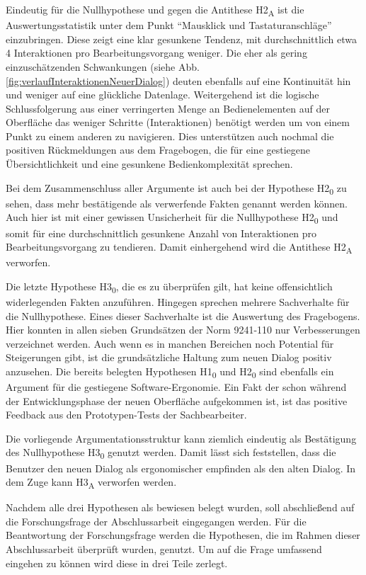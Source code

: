 Eindeutig für die Nullhypothese und gegen die Antithese H2\textsubscript{A} ist die Auswertungsstatistik unter dem Punkt \enquote{Mausklick und Tastaturanschläge} einzubringen. Diese zeigt eine klar gesunkene Tendenz, mit durchschnittlich etwa 4 Interaktionen pro Bearbeitungsvorgang weniger. Die eher als gering einzuschätzenden Schwankungen (siehe Abb. \ref{fig:verlaufInteraktionenNeuerDialog}) deuten ebenfalls auf eine Kontinuität hin und weniger auf eine glückliche Datenlage. Weitergehend ist die logische Schlussfolgerung aus einer verringerten Menge an Bedienelementen auf der Oberfläche das weniger Schritte (Interaktionen) benötigt werden um von einem Punkt zu einem anderen zu navigieren. Dies unterstützen auch nochmal die positiven Rückmeldungen aus dem Fragebogen, die für eine gestiegene Übersichtlichkeit und eine gesunkene Bedienkomplexität sprechen.

Bei dem Zusammenschluss aller Argumente ist auch bei der Hypothese H2\textsubscript{0} zu sehen, dass mehr bestätigende als verwerfende Fakten genannt werden können. Auch hier ist mit einer gewissen Unsicherheit für die Nullhypothese H2\textsubscript{0} und somit für eine durchschnittlich gesunkene Anzahl von Interaktionen pro Bearbeitungsvorgang zu tendieren. Damit einhergehend wird die Antithese H2\textsubscript{A} verworfen.

Die letzte Hypothese H3\textsubscript{0}, die es zu überprüfen gilt, hat keine offensichtlich widerlegenden Fakten anzuführen. Hingegen sprechen mehrere Sachverhalte für die Nullhypothese. Eines dieser Sachverhalte ist die Auswertung des Fragebogens. Hier konnten in allen sieben Grundsätzen der Norm 9241-110 nur Verbesserungen verzeichnet werden. Auch wenn es in manchen Bereichen noch Potential für Steigerungen gibt, ist die grundsätzliche Haltung zum neuen Dialog positiv anzusehen. Die bereits belegten Hypothesen H1\textsubscript{0} und H2\textsubscript{0} sind ebenfalls ein Argument für die gestiegene Software-Ergonomie. Ein Fakt der schon während der Entwicklungsphase der neuen Oberfläche aufgekommen ist, ist das positive Feedback aus den Prototypen-Tests der Sachbearbeiter.

Die vorliegende Argumentationsstruktur kann ziemlich eindeutig als Bestätigung des Nullhypothese H3\textsubscript{0} genutzt werden. Damit lässt sich feststellen, dass die Benutzer den neuen Dialog als ergonomischer empfinden als den alten Dialog. In dem Zuge kann H3\textsubscript{A} verworfen werden.

Nachdem alle drei Hypothesen als bewiesen belegt wurden, soll abschließend auf die Forschungsfrage der Abschlussarbeit eingegangen werden. Für die Beantwortung der Forschungsfrage werden die Hypothesen, die im Rahmen dieser Abschlussarbeit überprüft wurden, genutzt. Um auf die Frage umfassend eingehen zu können wird diese in drei Teile zerlegt. 

